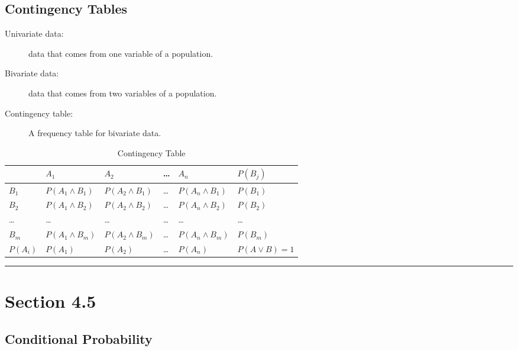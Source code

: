 \documentclass[12pt]{article}
\begin{document}
        \subsection*{Contingency Tables}
        \begin{description}
            \item[Univariate data:] data that comes from one variable of a population.
            \item[Bivariate data:] data that comes from two variables of a population.
            \item[Contingency table:] A frequency table for bivariate data.  
        \end{description}
                \begin{center}
                    \begin{table}[h!]
                        \centering
                        \caption{Contingency Table}
                        \begin{tabular}{l|l|l|l|l|l}
         & $A_1$               & $A_2$               & \dots & $A_n$               & $P(B_j)$          \\
\hline
$B_1$    & $P(A_1 \wedge B_1)$ & $P(A_2 \wedge B_1)$ & \dots & $P(A_n \wedge B_1)$ & $P(B_1)$         \\
$B_2$    & $P(A_1 \wedge B_2)$ & $P(A_2 \wedge B_2)$ & \dots & $P(A_n \wedge B_2)$ & $P(B_2)$         \\
\dots    & \dots               & \dots               & \dots & \dots               & \dots            \\
$B_m$    & $P(A_1 \wedge B_m)$ & $P(A_2 \wedge B_m)$ & \dots & $P(A_n \wedge B_m)$ & $P(B_m)$         \\
$P(A_i)$ & $P(A_1)$            & $P(A_2)$            & \dots & $P(A_n)$            & $P(A \vee B) =1$ \\
                        \end{tabular}
                      \end{table}
                \end{center}

    \noindent\rule{\textwidth}{0.4pt}
    \section*{Section 4.5}
        \subsection*{Conditional Probability}
\end{document}
